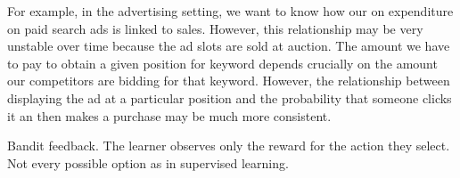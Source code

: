 For example, in the advertising setting, we want to know how our on expenditure on paid search ads is linked to sales. However, this relationship may be very unstable over time because the ad slots are sold at auction. The amount we have to pay to obtain a given position for keyword depends crucially on the amount our competitors are bidding for that keyword. However, the relationship between displaying the ad at a particular position and the probability that someone clicks it an then makes a purchase may be much more consistent. 

Bandit feedback. The learner observes only the reward for the action they select. Not every possible option as in supervised learning.

